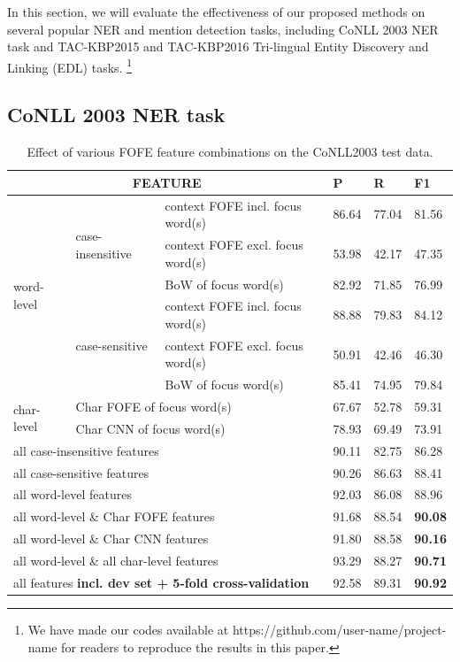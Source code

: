 \documentclass[11pt,a4paper]{article}
\begin{document}
In this section, we will evaluate the effectiveness of our proposed methods on several popular NER and mention detection tasks, including CoNLL 2003 NER task and 
TAC-KBP2015 and TAC-KBP2016 Tri-lingual Entity Discovery and Linking (EDL) tasks.
\footnote{We have made our codes available at https://github.com/user-name/project-name for readers to reproduce the results in this paper.}

\subsection{CoNLL 2003 NER task}

\begin{table}[h!]
	\centering
	\begin{tabular}{|l|l|l|lll|}
		\hline
		\multicolumn{3}{|c|}{FEATURE} & P & R & F1\\
		\hline\hline
		\multirow{6}{*}{word-level} & 
		\multirow{3}{*}{case-insensitive} &
		context FOFE incl. focus word(s) & 86.64 & 77.04 & 81.56 \\
		& &context FOFE excl. focus word(s) & 53.98 & 42.17 & 47.35  \\
		& & BoW of focus word(s) & 82.92 & 71.85 & 76.99  \\ \cline{2-6} 
		& \multirow{3}{*}{case-sensitive} & 
		context FOFE incl. focus word(s) & 88.88 & 79.83 &84.12  \\
		& &context FOFE excl. focus word(s) & 50.91 & 42.46 & 46.30  \\
		& & BoW of focus word(s) & 85.41 & 74.95 & 79.84  \\ \hline
		\multirow{2}{*}{char-level} &
		\multicolumn{2}{l|}{Char FOFE of focus word(s)} & 67.67 & 52.78 & 59.31  \\
		& \multicolumn{2}{l|}{Char CNN of focus word(s)} & 78.93 & 69.49 & 73.91 \\ \hline
		\multicolumn{3}{|l|}{all case-insensitive features} &  90.11 & 82.75 &  86.28  \\ 
		\multicolumn{3}{|l|}{all case-sensitive features} & 90.26 & 86.63 & 88.41 \\ 
		\multicolumn{3}{|l|}{all word-level features} & 92.03 & 86.08 & 88.96  \\ \hline
		\multicolumn{3}{|l|}{all word-level \& Char FOFE features} & 91.68 &  88.54 & \bf 90.08 \\
		\multicolumn{3}{|l|}{all word-level \& Char CNN features} & 91.80 & 88.58 & \bf 90.16 \\ \hline
		\multicolumn{3}{|l|}{all word-level \& all char-level features}  & 93.29 &  88.27 &  \bf 90.71  \\
		\multicolumn{3}{|l|}{all features \bf{incl. dev set} + 5-fold cross-validation}  & 92.58 &  89.31 &  \bf 90.92  \\
		\hline
	\end{tabular}
	\caption{Effect of various FOFE feature combinations on the CoNLL2003 test data.}
	\label{tbl:feat-cmp:CoNLL03}
\end{table}
\end{document}
